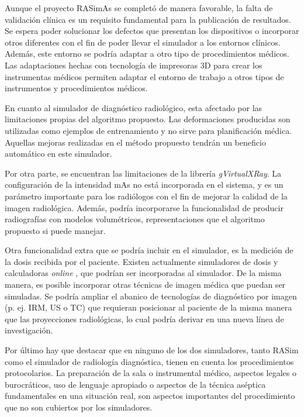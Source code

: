 Aunque el proyecto \ac{RASimAs} se completó de manera favorable, la falta de validación clínica es un requisito fundamental para la publicación de resultados. Se espera poder solucionar los defectos que presentan los dispositivos o incorporar otros diferentes con el fin de poder llevar el simulador a los entornos clínicos.
Además, este entorno se podría adaptar a otro tipo de procedimientos médicos. Las adaptaciones hechas con tecnología de impresoras 3D para crear los instrumentas médicos permiten adaptar el entorno de trabajo a otros tipos de instrumentos y procedimientos médicos.

En cuanto al simulador de diagnóstico radiológico, esta afectado por las limitaciones propias del algoritmo propuesto. Las deformaciones producidas son utilizadas como ejemplos de entrenamiento y no sirve para planificación médica. Aquellas mejoras realizadas en el método propuesto tendrán un beneficio automático en este simulador.

Por otra parte, se encuentran las limitaciones de la librería \emph{gVirtualXRay}. La configuración de la intensidad \acs{mAs} no está incorporada en el sistema, y es un parámetro importante para los radiólogos con el fin de mejorar la calidad de la imagen radiológica. Además, podría incorporarse la funcionalidad de producir radiografías con modelos volumétricos, representaciones que el algoritmo propuesto si puede manejar.

Otra funcionalidad extra que se podría incluir en el simulador, es la medición de la dosis recibida por el paciente. Existen actualmente simuladores de dosis y calculadoras \emph{online} \cite{xraydose}, que podrían ser incorporadas al simulador. De la misma manera, es posible incorporar otras técnicas de imagen médica que puedan ser simuladas. Se podría ampliar el abanico de tecnologías de diagnóstico por imagen (p. ej. \acs{IRM}, \acs{US} o \acs{TC}) que requieran posicionar al paciente de la misma manera que las proyecciones radiológicas, lo cual podría derivar en una nueva línea de investigación.


Por último hay que destacar que en ninguno de los dos simuladores, tanto \ac{RASim} como el simulador de radiología diagnóstica, tienen en cuenta los procedimientos protocolarios. La preparación de la sala o instrumental médico, aspectos legales o burocráticos, uso de lenguaje apropiado o aspectos de la técnica aséptica fundamentales en una situación real, son aspectos importantes del procedimiento que no son cubiertos por los simuladores. 






